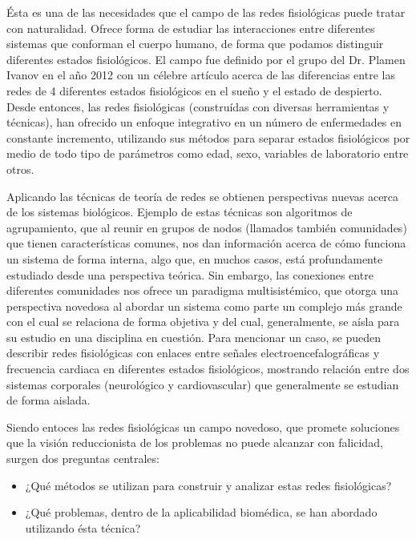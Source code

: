 \documentclass[twoside,twocolumn]{article}
\begin{document}
Ésta es una de las necesidades que el campo de las redes fisiológicas puede tratar con naturalidad.
Ofrece forma de estudiar las interacciones entre diferentes sistemas que conforman el cuerpo humano, de forma que podamos distinguir diferentes estados fisiológicos.
El campo fue definido por el grupo del Dr. Plamen Ivanov en el año 2012 con un célebre artículo acerca de las diferencias entre las redes de 4 diferentes estados fisiológicos en el sueño y el estado de despierto\cite{bashan2012network}.
Desde entonces, las redes fisiológicas (construídas con diversas herramientas y técnicas), han ofrecido un enfoque integrativo en un número de enfermedades en constante incremento, utilizando sus métodos para separar estados fisiológicos por medio de todo tipo de parámetros como edad, sexo, variables de laboratorio entre otros\cite{ivanov2016focus}.

Aplicando las técnicas de teoría de redes se obtienen perspectivas nuevas acerca de los sistemas biológicos.
Ejemplo de estas técnicas son algoritmos de agrupamiento, que al reunir en grupos de nodos (llamados también comunidades) que tienen características comunes, nos dan información acerca de cómo funciona un sistema de forma interna, algo que, en muchos casos, está profundamente estudiado desde una perspectiva teórica.
Sin embargo, las conexiones entre diferentes comunidades nos ofrece un paradigma multisistémico, que otorga una perspectiva novedosa al abordar un sistema como parte un complejo más grande con el cual se relaciona de forma objetiva y del cual, generalmente, se aísla para su estudio en una disciplina en cuestión.
Para mencionar un caso, se pueden describir redes fisiológicas con enlaces entre señales electroencefalográficas y frecuencia cardiaca en diferentes estados fisiológicos, mostrando relación entre dos sistemas corporales (neurológico y cardiovascular) que generalmente se estudian de forma aislada\cite{campos2018hipertension}.

Siendo entoces las redes fisiológicas un campo novedoso, que promete soluciones que la visión reduccionista de los problemas no puede alcanzar con falicidad, surgen dos preguntas centrales:
\begin{itemize}
  \item ¿Qué métodos se utilizan para construir y analizar estas redes fisiológicas?
  \item ¿Qué problemas, dentro de la aplicabilidad biomédica, se han abordado utilizando ésta técnica?
\end{itemize}
\end{document}
